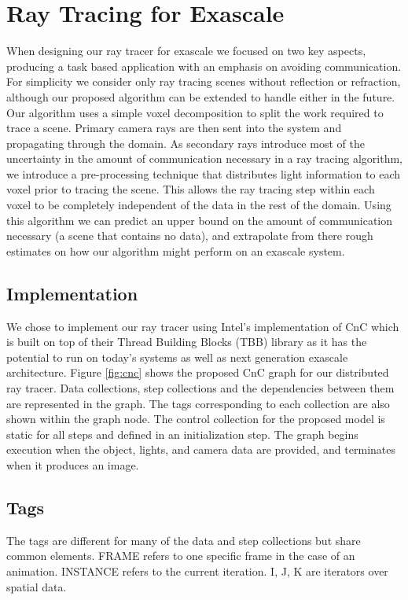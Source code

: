 \section{Ray Tracing for Exascale}

When designing our ray tracer for exascale we focused on two key aspects, producing a task based application with an emphasis on avoiding communication.  For simplicity we consider only ray tracing scenes without reflection or refraction, although our proposed algorithm can be extended to handle either in the future.  Our algorithm uses a simple voxel decomposition to split the work required to trace a scene.  Primary camera rays are then sent into the system and propagating through the domain. As secondary rays introduce most of the uncertainty in the amount of communication necessary in a ray tracing algorithm, we introduce a pre-processing technique that distributes light information to each voxel prior to tracing the scene.  This allows the ray tracing step within each voxel to be completely independent of the data in the rest of the domain.  Using this algorithm we can predict an upper bound on the amount of communication necessary (a scene that contains no data), and extrapolate from there rough estimates on how our algorithm might perform on an exascale system.

\subsection{Implementation}

We chose to implement our ray tracer using Intel’s implementation of CnC which is built on top of their Thread Building Blocks (TBB) library as it has the potential to run on today’s systems as well as next generation exascale architecture.  Figure \ref{fig:cnc} shows the proposed CnC graph for our distributed ray tracer. Data collections, step collections and the dependencies between them are represented in the graph. The tags corresponding to each collection are also shown within the graph node. The control collection for the proposed model is static for all steps and defined in an initialization step. The graph begins execution when the object, lights, and camera data are provided, and terminates when it produces an image.

\subsection{Tags}

The tags are different for many of the data and step collections but share common elements.  FRAME refers to one specific frame in the case of an animation.  INSTANCE refers to the current iteration. I, J, K are iterators over spatial data.

